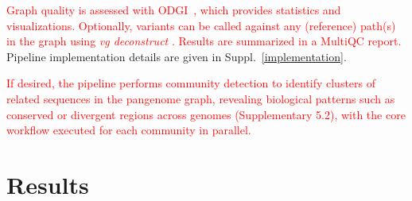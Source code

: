 \documentclass{bioinfo}
\theoremstyle{definition}
\newcommand{\red}[1]{{\textcolor{Red}{#1}}}
\begin{document}
	\red{Graph quality is assessed with ODGI~\citep{Guarracino2022}, which provides statistics and visualizations.} %
	\red{Optionally, variants can be called against any (reference) path(s) in the graph using \textit{vg deconstruct} \citep{Garrison:2018}. 
	Results are summarized in a MultiQC \citep{Ewels_2016} report.} 
	Pipeline implementation details are given in Suppl.~\ref{implementation}.
	
\red{	If desired, the pipeline performs community detection to identify clusters of related sequences in the pangenome graph, revealing biological patterns such as conserved or divergent regions across genomes (Supplementary 5.2), with the core workflow executed for each community in parallel.}
	\vspace{-0.6cm}
	\section{Results}
	
	
\end{document}
